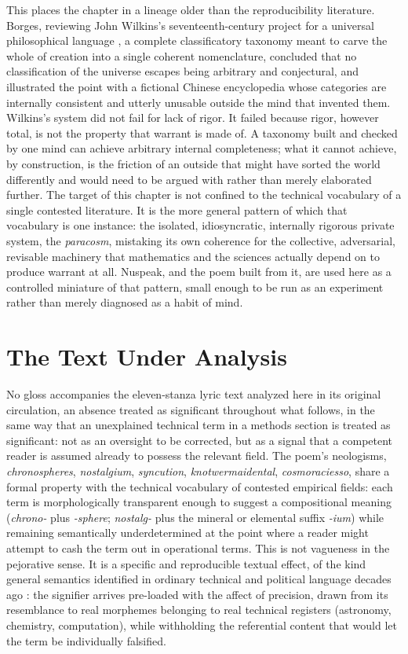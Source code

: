 This places the chapter in a lineage older than the reproducibility literature. Borges, reviewing John Wilkins's seventeenth-century project for a universal philosophical language \cite{borges1964}, a complete classificatory taxonomy meant to carve the whole of creation into a single coherent nomenclature, concluded that no classification of the universe escapes being arbitrary and conjectural, and illustrated the point with a fictional Chinese encyclopedia whose categories are internally consistent and utterly unusable outside the mind that invented them. Wilkins's system did not fail for lack of rigor. It failed because rigor, however total, is not the property that warrant is made of. A taxonomy built and checked by one mind can achieve arbitrary internal completeness; what it cannot achieve, by construction, is the friction of an outside that might have sorted the world differently and would need to be argued with rather than merely elaborated further. The target of this chapter is not confined to the technical vocabulary of a single contested literature. It is the more general pattern of which that vocabulary is one instance: the isolated, idiosyncratic, internally rigorous private system, the \emph{paracosm}, mistaking its own coherence for the collective, adversarial, revisable machinery that mathematics and the sciences actually depend on to produce warrant at all. Nuspeak, and the poem built from it, are used here as a controlled miniature of that pattern, small enough to be run as an experiment rather than merely diagnosed as a habit of mind.

\section{The Text Under Analysis}

No gloss accompanies the eleven-stanza lyric text analyzed here in its original circulation, an absence treated as significant throughout what follows, in the same way that an unexplained technical term in a methods section is treated as significant: not as an oversight to be corrected, but as a signal that a competent reader is assumed already to possess the relevant field. The poem's neologisms, \emph{chronospheres}, \emph{nostalgium}, \emph{syncution}, \emph{knotwermaidental}, \emph{cosmoraciesso}, share a formal property with the technical vocabulary of contested empirical fields: each term is morphologically transparent enough to suggest a compositional meaning (\emph{chrono-} plus \emph{-sphere}; \emph{nostalg-} plus the mineral or elemental suffix \emph{-ium}) while remaining semantically underdetermined at the point where a reader might attempt to cash the term out in operational terms. This is not vagueness in the pejorative sense. It is a specific and reproducible textual effect, of the kind general semantics identified in ordinary technical and political language decades ago \cite{korzybski1933,hayakawa1941}: the signifier arrives pre-loaded with the affect of precision, drawn from its resemblance to real morphemes belonging to real technical registers (astronomy, chemistry, computation), while withholding the referential content that would let the term be individually falsified.

